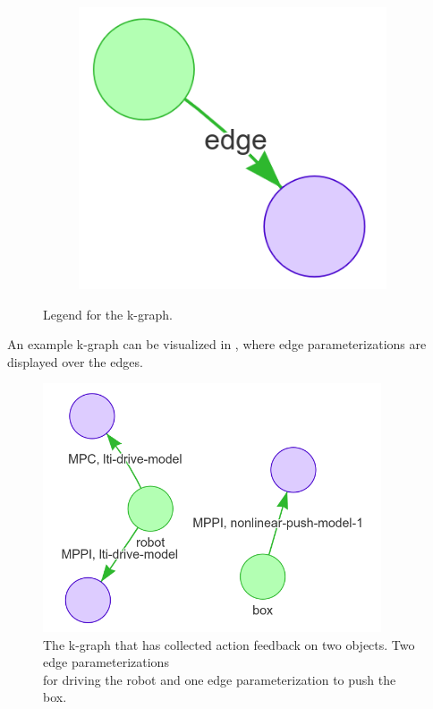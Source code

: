 \begin{figure}[H]
\begin{subfigure}{0.3\textwidth}
    \caption{}%
    \end{subfigure}
    \begin{subfigure}{0.3\textwidth}
    \centering
    \includegraphics[width=\textwidth]{figures/proposed_method/k-graph_edge}
    \caption{}
    \end{subfigure}
    \caption{Legend for the \acl{k-graph}.}%
    \label{fig:k-graph_legend}
\end{figure}

An example \ac{k-graph} can be visualized in , where edge parameterizations are displayed over the edges.\bs

\begin{figure}[H]
    \centering
    \includegraphics[width=10cm]{figures/proposed_method/k-graph_example}
    \caption{The \ac{k-graph} that has collected action feedback on two objects. Two edge parameterizations\\for driving the robot and one edge parameterization to push the box.}%
    \label{fig:k-graph_example}
\end{figure}

